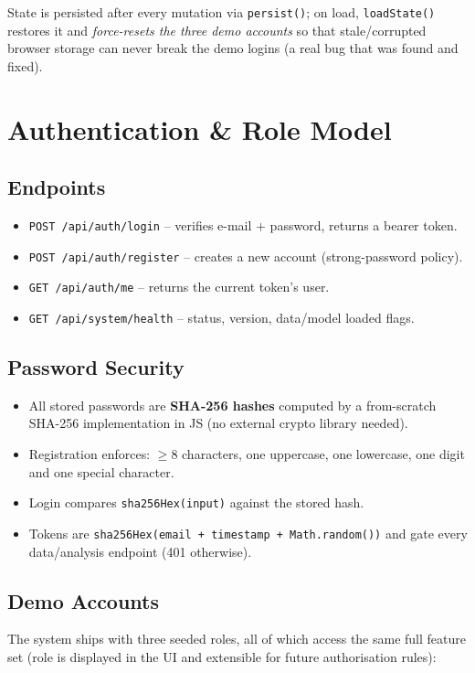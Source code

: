 \documentclass[11pt,a4paper]{article}
\newcommand{\code}[1]{\texttt{\small #1}}
\begin{document}
State is persisted after every mutation via \code{persist()}; on load, \code{loadState()}
restores it and \emph{force-resets the three demo accounts} so that stale/corrupted browser
storage can never break the demo logins (a real bug that was found and fixed).

\section{Authentication \& Role Model}
\label{sec:auth}

\subsection{Endpoints}
\begin{itemize}[leftmargin=1.5em]
  \item \code{POST /api/auth/login} -- verifies e-mail + password, returns a bearer token.
  \item \code{POST /api/auth/register} -- creates a new account (strong-password policy).
  \item \code{GET /api/auth/me} -- returns the current token's user.
  \item \code{GET /api/system/health} -- status, version, data/model loaded flags.
\end{itemize}

\subsection{Password Security}
\begin{itemize}[leftmargin=1.5em]
  \item All stored passwords are \textbf{SHA-256 hashes} computed by a from-scratch SHA-256
        implementation in JS (no external crypto library needed).
  \item Registration enforces: $\geq 8$ characters, one uppercase, one lowercase, one digit and
        one special character.
  \item Login compares \code{sha256Hex(input)} against the stored hash.
  \item Tokens are \code{sha256Hex(email + timestamp + Math.random())} and gate every
        data/analysis endpoint (401 otherwise).
\end{itemize}

\subsection{Demo Accounts}
The system ships with three seeded roles, all of which access the same full feature set
(role is displayed in the UI and extensible for future authorisation rules):
\end{document}
